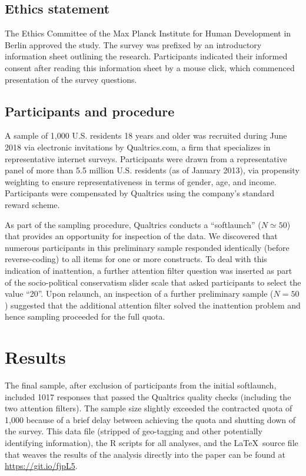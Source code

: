 \documentclass[fignum,man]{apa}\usepackage[]{graphicx}\usepackage[]{color}
\begin{document}
\subsection{Ethics statement}
The Ethics Committee of the Max Planck Institute for Human Development
in Berlin approved the study. 
The survey was prefixed
by an introductory information sheet outlining the research.
Participants indicated their informed consent after reading this information sheet 
by 
a mouse click, which commenced presentation of the
survey questions.

\subsection{Participants and procedure}

A sample of 1,000 U.S. residents 18 years and older was recruited during June 2018
via electronic invitations by Qualtrics.com, a firm that
specializes in representative internet surveys. 
Participants were
drawn from a representative panel of more than 5.5 million
U.S. residents (as of January 2013), via propensity weighting to
ensure representativeness in terms of gender, age, and income.
Participants were compensated by Qualtrics using the company's
standard reward scheme.

As part of the sampling procedure, Qualtrics conducts a
``softlaunch'' ($N \simeq 50$) that provides an opportunity for
inspection of the data. We discovered that numerous participants 
in this preliminary sample 
responded identically (before reverse-coding)
to all items for one or more constructs. 
To deal with this indication
of inattention, a further attention filter question was
inserted as part of the socio-political conservatism slider scale that asked
participants to select the value ``20''. Upon relaunch, 
an inspection of a further preliminary sample ($N=50$) suggested
that the additional attention filter
solved the inattention problem and hence sampling proceeded
for the full quota.

\section{Results}
The final sample, after exclusion of participants from 
the initial softlaunch, included 1017 responses that passed the Qualtrics
quality checks (including the two attention filters). The sample size
slightly exceeded the contracted quota of 1,000 because of a brief delay
between achieving the quota and shutting down of the survey.
This data file (stripped of geo-tagging and other potentially identifying 
information), 
the R scripts for all analyses, and the \LaTeX ~source file 
that weaves the results of the analysis directly into the paper can be found 
at \url{https://git.io/fjpL5}. 
\end{document}
